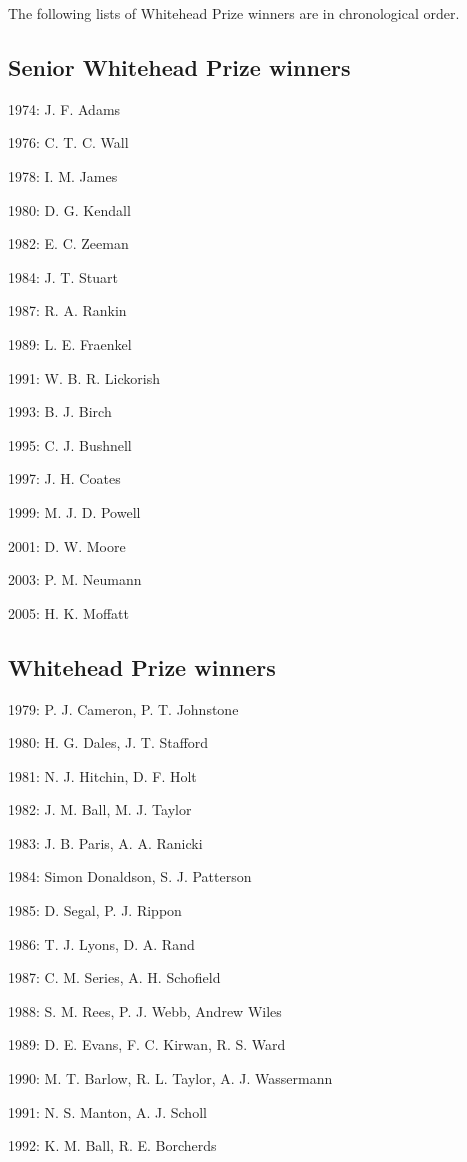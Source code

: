\documentclass[12pt]{article}
\begin{document}
The following lists of Whitehead Prize winners are in chronological order.

\subsection{Senior Whitehead Prize winners}

1974: J. F. Adams 

1976: C. T. C. Wall 

1978: I. M. James 

1980: D. G. Kendall 

1982: E. C. Zeeman 

1984: J. T. Stuart 

1987: R. A. Rankin

1989: L. E. Fraenkel

1991: W. B. R. Lickorish

1993: B. J. Birch

1995: C. J. Bushnell

1997: J. H. Coates

1999: M. J. D. Powell 

2001: D. W. Moore

2003: P. M. Neumann

2005: H. K. Moffatt  

\subsection{Whitehead Prize winners}

1979: P. J. Cameron, P. T. Johnstone

1980: H. G. Dales, J. T. Stafford

1981: N. J. Hitchin, D. F. Holt

1982: J. M. Ball, M. J. Taylor

1983: J. B. Paris, A. A. Ranicki

1984: Simon Donaldson, S. J. Patterson

1985: D. Segal, P. J. Rippon

1986: T. J. Lyons, D. A. Rand

1987: C. M. Series, A. H. Schofield

1988: S. M. Rees, P. J. Webb, Andrew Wiles

1989: D. E. Evans, F. C. Kirwan, R. S. Ward

1990: M. T. Barlow, R. L. Taylor, A. J. Wassermann

1991: N. S. Manton, A. J. Scholl

1992: K. M. Ball, R. E. Borcherds
\end{document}
